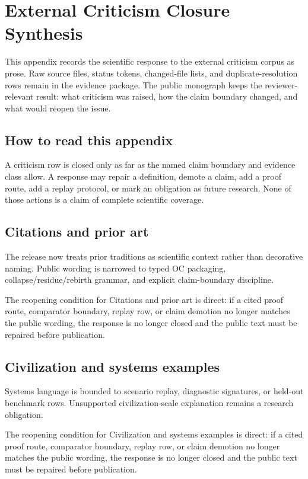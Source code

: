 \section{External Criticism Closure Synthesis}

\label{sec:oc13-external-criticism-closure}

This appendix records the scientific response to the external criticism corpus as prose. Raw source files, status tokens, changed-file lists, and duplicate-resolution rows remain in the evidence package. The public monograph keeps the reviewer-relevant result: what criticism was raised, how the claim boundary changed, and what would reopen the issue.


\subsection{How to read this appendix}

A criticism row is closed only as far as the named claim boundary and evidence class allow. A response may repair a definition, demote a claim, add a proof route, add a replay protocol, or mark an obligation as future research. None of those actions is a claim of complete scientific coverage.


\subsection{Citations and prior art}

The release now treats prior traditions as scientific context rather than decorative naming. Public wording is narrowed to typed OC packaging, collapse/residue/rebirth grammar, and explicit claim-boundary discipline.


The reopening condition for Citations and prior art is direct: if a cited proof route, comparator boundary, replay row, or claim demotion no longer matches the public wording, the response is no longer closed and the public text must be repaired before publication.


\subsection{Civilization and systems examples}

Systems language is bounded to scenario replay, diagnostic signatures, or held-out benchmark rows. Unsupported civilization-scale explanation remains a research obligation.


The reopening condition for Civilization and systems examples is direct: if a cited proof route, comparator boundary, replay row, or claim demotion no longer matches the public wording, the response is no longer closed and the public text must be repaired before publication.


